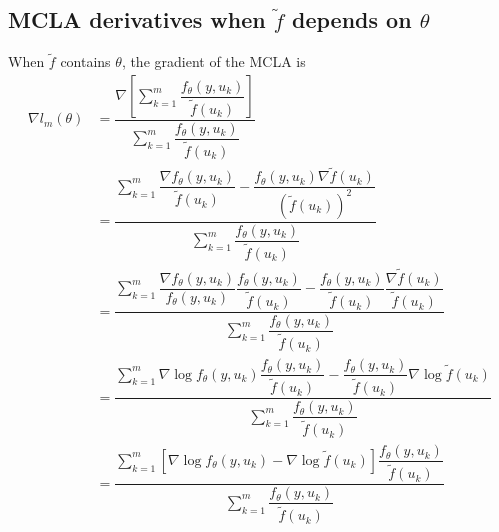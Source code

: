 \documentclass{article}
\begin{document}
\subsection{MCLA derivatives when $\tilde{f}$ depends on $\theta$} \label{sec:calcs}
When $\tilde{f}$ contains $\theta$, the gradient of the MCLA is
\begin{align}
\nabla l_m(\theta) &= \dfrac{ \nabla \left[ \sum_{k=1}^m  \dfrac{ f_\theta(y,u_k)   }{\tilde{f}(u_k)}  \right] }{\sum_{k=1}^m  \dfrac{ f_\theta(y,u_k)   }{\tilde{f}(u_k)}} \\
&= \dfrac{   \sum_{k=1}^m  \dfrac{\nabla f_\theta(y,u_k)   }{\tilde{f}(u_k)} - \dfrac{ f_\theta(y,u_k)  \nabla \tilde{f}(u_k) }{\left(\tilde{f}(u_k) \right)^2 } }{\sum_{k=1}^m  \dfrac{ f_\theta(y,u_k)   }{\tilde{f}(u_k)}} \\
&= \dfrac{   \sum_{k=1}^m  \dfrac{\nabla f_\theta(y,u_k)}{f_\theta(y,u_k)} \dfrac{f_\theta(y,u_k)}{\tilde{f}(u_k)} -
 \dfrac{ f_\theta(y,u_k)}{\tilde{f}(u_k)} \dfrac{ \nabla \tilde{f}(u_k) }{\tilde{f}(u_k) } }{\sum_{k=1}^m  \dfrac{ f_\theta(y,u_k)   }{\tilde{f}(u_k)}} \\
&= \dfrac{   \sum_{k=1}^m  \nabla \log f_\theta(y,u_k) \dfrac{f_\theta(y,u_k)}{\tilde{f}(u_k)} -
 \dfrac{ f_\theta(y,u_k)}{\tilde{f}(u_k)}  \nabla \log \tilde{f}(u_k)  }{\sum_{k=1}^m  \dfrac{ f_\theta(y,u_k)   }{\tilde{f}(u_k)}} \\
&= \dfrac{   \sum_{k=1}^m \left[ \nabla \log f_\theta(y,u_k)  -
   \nabla \log \tilde{f}(u_k)   \right]  \dfrac{ f_\theta(y,u_k)}{\tilde{f}(u_k)}  }{\sum_{k=1}^m  \dfrac{ f_\theta(y,u_k)   }{\tilde{f}(u_k)}} 
\end{align}
\end{document}
